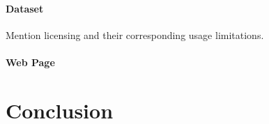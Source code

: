 \paragraph{Dataset}
\par\vspace{6pt}
Mention licensing and their corresponding usage limitations.

\paragraph{Web Page}
\par\vspace{6pt}


\section{Conclusion}
\label{sec:MethodologyConclusion}

